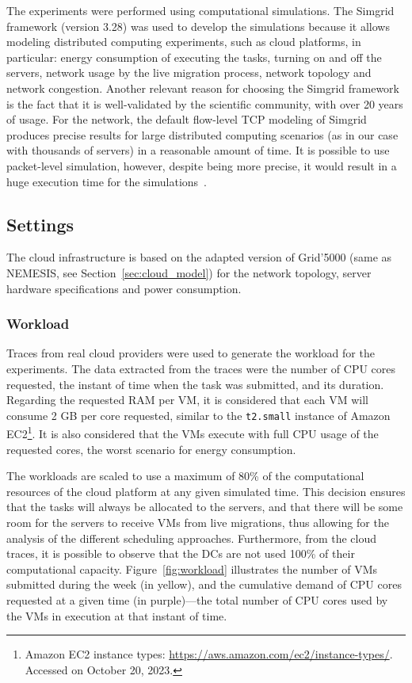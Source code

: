 The experiments were performed using computational simulations. The Simgrid~\cite{CASANOVA20142899} framework (version 3.28) was used to develop the simulations because it allows modeling distributed computing experiments, such as cloud platforms, in particular: energy consumption of executing the tasks, turning on and off the servers, network usage by the live migration process, network topology and network congestion. Another relevant reason for choosing the Simgrid framework is the fact that it is well-validated by the scientific community, with over 20 years of usage. For the network, the default flow-level TCP modeling of Simgrid produces precise results for large distributed computing scenarios (as in our case with thousands of servers) in a reasonable amount of time. It is possible to use packet-level simulation, however, despite being more precise, it would result in a huge execution time for the simulations~\cite{velho2013simgridparameters}. 


\subsection{Settings}

\label{sec:settings_smartgreens}

The cloud infrastructure is based on the adapted version of Grid'5000 (same as NEMESIS, see Section~\ref{sec:cloud_model}) for the network topology,  server hardware specifications and power consumption.

\subsubsection{Workload}

Traces from real cloud providers were used to generate the workload for the experiments. The data extracted from the traces were the number of CPU cores requested, the instant of time when the task was submitted, and its duration. Regarding the requested RAM per VM, it is considered that each VM will consume 2 GB per core requested, similar to the \texttt{t2.small} instance of Amazon EC2\footnote{Amazon EC2 instance types: \url{https://aws.amazon.com/ec2/instance-types/}. Accessed on October 20, 2023.}. It is also considered that the VMs execute with full CPU usage of the requested cores, the worst scenario for energy consumption. 

The workloads are scaled to use a maximum of 80\% of the computational resources of the cloud platform at any given simulated time. This decision ensures that the tasks will always be allocated to the servers, and that there will be some room for the servers to receive VMs from live migrations, thus allowing for the analysis of the different scheduling approaches. Furthermore, from the cloud traces, it is possible to observe that the DCs are not used 100\% of their computational capacity. Figure~\ref{fig:workload} illustrates the number of VMs submitted during the week (in yellow), and the cumulative demand of CPU cores requested at a given time (in purple)---the total number of CPU cores used by the VMs in execution at that instant of time.

